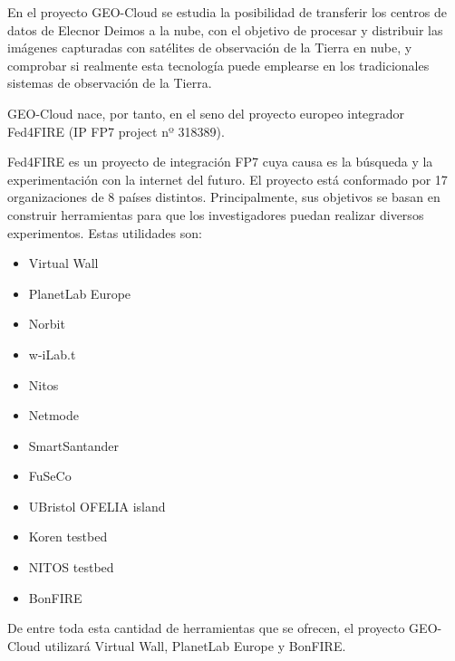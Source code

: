 En el proyecto GEO-Cloud se estudia la posibilidad de transferir los centros de datos de Elecnor Deimos a la nube, con el objetivo de procesar y distribuir las imágenes capturadas con satélites de observación de la Tierra en nube, y comprobar si realmente esta tecnología puede emplearse en los tradicionales sistemas de observación de la Tierra.

GEO-Cloud nace, por tanto, en el seno del proyecto europeo integrador Fed4FIRE (IP FP7 project nº 318389).

Fed4FIRE\cite{F4F} es un proyecto de integración FP7 cuya causa es la búsqueda y la experimentación con la internet del futuro. El proyecto está conformado por 17 organizaciones de 8 países distintos.
Principalmente, sus objetivos se basan en construir herramientas para que los investigadores puedan realizar diversos experimentos. Estas utilidades son:
\begin{itemize}
\item Virtual Wall
\item PlanetLab Europe
\item Norbit
\item w-iLab.t
\item Nitos
\item Netmode
\item SmartSantander
\item FuSeCo
\item UBristol OFELIA island
\item Koren testbed
\item NITOS testbed
\item BonFIRE
\end{itemize}

De entre toda esta cantidad de herramientas que se ofrecen, el proyecto GEO-Cloud utilizará Virtual Wall, PlanetLab Europe y BonFIRE.


